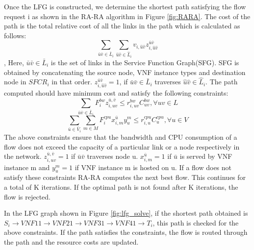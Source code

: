 Once the LFG is constructed, we determine the shortest path satisfying the flow request i as shown in the RA-RA algorithm in Figure \ref{fig:RARA}. The cost of the path is the total relative cost of all the links in the path which is calculated as follows:\\
$$ \sum_{\bar{u}\bar{v} \in \bar{L}_i}\sum_{\hat{u}\hat{v} \in \hat{L}_i} v_{i, \hat{u}\hat{v}} z_{i,\hat{u}\hat{v}}^{\bar{u}\bar{v}}$$,
Here, $\bar{u}\bar{v} \in \bar{L}_i$ is the set of links in the Service Function Graph(SFG). SFG is obtained by concatenating the source node, VNF instance types and destination node in $SFCR_i$ in that order. $z_{i,\hat{u}\hat{v}}^{\bar{u}\bar{v}} = 1$, if $\bar{u}\bar{v} \in \bar{L}_i$ traverses $\hat{u}\hat{v} \in \hat{L}_i$.
The path computed should have minimum cost and satisfy the following constraints:\\
$$\sum_{\bar{u}\bar{v} \in \bar{L}_i} F_i^{bw} z_{i, uv}^{\bar{u},\bar{v}} \le r_{i,uv}^{bw}C_{uv}^{bw}, \forall uv \in L$$
$$\sum_{\bar{u} \in \bar{V}_i}\sum_{m \in M} F_i^{cpu}x_{i,m}^{\bar{u}}y_u^m \le r_{i,u}^{cpu}C_u^{cpu}, \forall u \in V$$
The above constraints ensure that the bandwidth and CPU consumption of a flow does not exceed the capacity of a particular link or a node respectively in the network. $z_{i, uv}^{\bar{u},\bar{v}} = 1$ if $\bar{u}\bar{v}$ traverses node u. $x_{i,m}^{\bar{u}} = 1$ if $\bar{u}$ is served by VNF instance m and $y_u^m = 1$ if VNF instance m is hosted on u. If a flow does not satisfy these constraints RA-RA computes the next best flow. This continues for a total of K iterations. If the optimal path is not found after K iterations, the flow is rejected.

In the LFG graph shown in Figure \ref{fig:lfg_solve}, if the shortest path obtained is $S_i \rightarrow VNF11 \rightarrow VNF21 \rightarrow VNF31 \rightarrow VNF41 \rightarrow T_i$, this path is checked for the above constraints. If the path satisfies the constraints, the flow is routed through the path and the resource costs are updated.

